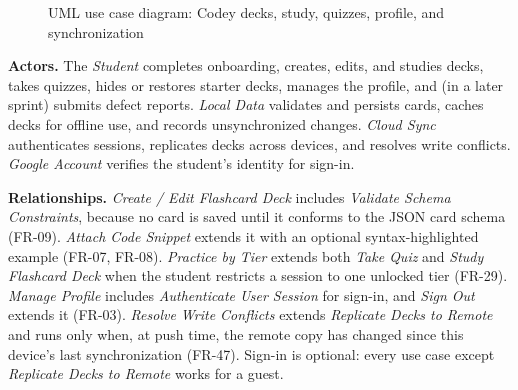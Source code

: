 \documentclass[12pt,letterpaper]{article}
\newcommand{\st}[1]{\guillemotleft#1\guillemotright}   %
\begin{document}
\begin{figure}[!htbp]
{}
\caption{UML use case diagram: Codey decks, study, quizzes, profile, and synchronization}
\label{fig:usecase}
\end{figure}

\textbf{Actors.} The \emph{Student} completes onboarding, creates, edits, and studies
decks, takes quizzes, hides or restores starter decks, manages the profile, and (in a
later sprint) submits defect reports. \emph{Local Data} validates and persists cards,
caches decks for offline use, and records unsynchronized changes. \emph{Cloud Sync}
authenticates sessions, replicates decks across devices, and resolves write conflicts.
\emph{Google Account} verifies the student's identity for sign-in.

\textbf{Relationships.} \emph{Create / Edit Flashcard Deck} includes \emph{Validate
Schema Constraints}, because no card is saved until it conforms to the JSON card schema
(FR-09). \emph{Attach Code Snippet} extends it with an optional syntax-highlighted
example (FR-07, FR-08). \emph{Practice by Tier} extends both \emph{Take Quiz} and
\emph{Study Flashcard Deck} when the student restricts a session to one unlocked tier
(FR-29). \emph{Manage Profile} includes \emph{Authenticate User Session} for sign-in,
and \emph{Sign Out} extends it (FR-03). \emph{Resolve Write Conflicts} extends
\emph{Replicate Decks to Remote} and runs only when, at push time, the remote copy has
changed since this device's last synchronization (FR-47). Sign-in is optional:
every use case except \emph{Replicate Decks to Remote} works for a guest.
\end{document}
